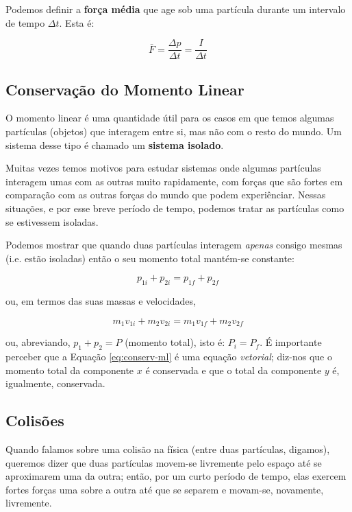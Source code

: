 Podemos definir a \textbf{força média} que age sob uma partícula durante um intervalo de tempo $\Delta t$. Esta é:

$$
\bar{F}=\frac{\Delta p}{\Delta t}=\frac{I}{\Delta t}
$$

\subsection{Conservação do Momento Linear}
O momento linear é uma quantidade útil para os casos em que temos algumas partículas (objetos) que interagem entre si, mas não com o resto do mundo. Um sistema desse tipo é chamado um \textbf{sistema isolado}.

Muitas vezes temos motivos para estudar sistemas onde algumas partículas interagem umas com as outras muito rapidamente, com forças que são fortes em comparação com as outras forças do mundo que podem experiênciar. Nessas situações, e por esse breve período de tempo, podemos tratar as partículas como se estivessem isoladas.

Podemos mostrar que quando duas partículas interagem \emph{apenas} consigo mesmas (i.e. estão isoladas) então o seu momento total mantém-se constante:

\begin{equation}\label{eq:conserv-ml}
    p_{1i}+p_{2i}=p_{1f}+p_{2f}
\end{equation}

ou, em termos das suas massas e velocidades,

\begin{equation}
    m_1v_{1i}+m_2v_{2i}=m_1v_{1f}+m_2v_{2f}
\end{equation}

ou, abreviando, $p_1+p_2=P$ (momento total), isto é: $P_i=P_f$.
É importante perceber que a Equação \ref{eq:conserv-ml} é uma equação \emph{vetorial}; diz-nos que o momento total da componente $x$ é conservada e que o total da componente $y$ é, igualmente, conservada.

\subsection{Colisões}
Quando falamos sobre uma colisão na física (entre duas partículas, digamos), queremos dizer que duas partículas movem-se livremente pelo espaço até se aproximarem uma da outra; então, por um
curto período de tempo, elas exercem fortes forças uma sobre a outra até que se separem e movam-se, novamente, livremente.

